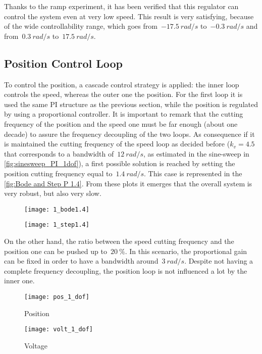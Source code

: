 Thanks to the ramp experiment, it has been verified that this regulator can control the system even at very low speed. This result is very satisfying, because of the wide controllability range, which goes from~$-17.5\ rad/s$ to~$-0.3\ rad/s$ and from~$0.3\ rad/s$ to~$17.5\ rad/s$.

\newpage
\subsection{Position Control Loop}
To control the position, a cascade control strategy is applied: the inner loop controls the speed, whereas the outer one the position. For the first loop it is used the same PI structure as the previous section, while the position is regulated by using a proportional controller. It is important to remark that the cutting frequency of the position and the speed one must be far enough (about one decade) to assure the frequency decoupling of the two loops. As consequence if it is maintained the cutting frequency of the speed loop as decided before ($k_v=4.5$ that corresponds to a bandwidth of~$12\ rad/s$, as estimated in the sine-sweep in \cref{fig:sinesweep_PI_1dof}), a first possible solution is reached by setting the position cutting frequency equal to~$1.4\ rad/s$. This case is represented in the \cref{fig:Bode and Step P 1.4}. From these plots it emerges that the overall system is very robust, but also very slow.

\begin{figure*}[h]
	\centering
	\begin{subfigure}{0.47\columnwidth}
		\texttt{[image: 1\_bode1.4]}
	\end{subfigure}
	\begin{subfigure}{0.47\columnwidth}
		\texttt{[image: 1\_step1.4]}
	\end{subfigure}
	\caption{Position control loop with  $w_{c,p}=1.4\ rad/s$}
	\label{fig:Bode and Step P 1.4}
\end{figure*}

On the other hand, the ratio between the speed cutting frequency and the position one can be pushed up to~$20\ \%$. In this scenario, the proportional gain can be fixed in order to have a bandwidth around~$3\ rad/s$. Despite not having a complete frequency decoupling, the position loop is not influenced a lot by the inner one.
\begin{figure*}[h]
	\centering
	\begin{subfigure}{0.45\columnwidth}
		\texttt{[image: pos\_1\_dof]}
		\caption{Position}
	\end{subfigure}
	\begin{subfigure}{0.45\columnwidth}
		\texttt{[image: volt\_1\_dof]}
		\caption{Voltage}
	\end{subfigure}
	\caption{Step response with $k_{p}=3.5$}
	\label{fig:Pos_1dof_3.5}
\end{figure*}

